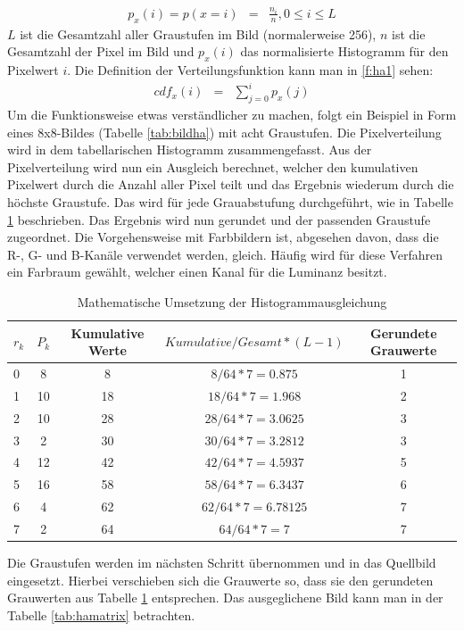 \begin{eqnarray} \label{f:ha1} p_{x}(i)=p(x=i)&=&\frac{n_{i}}{n}, 0\leq i \leq L \end{eqnarray}
$L$ ist die Gesamtzahl aller Graustufen im Bild (normalerweise 256), $n$ ist die Gesamtzahl der Pixel im Bild und $p_{x}(i)$ das normalisierte Histogramm für den Pixelwert $i$. Die Definition der Verteilungsfunktion kann man in \ref{f:ha1} sehen:
\begin{eqnarray} cdf_{x}(i) &=& \sum_{j=0}^i p_{x}(j)\end{eqnarray}
Um die Funktionsweise etwas verständlicher zu machen, folgt ein Beispiel in Form eines 8x8-Bildes (Tabelle \ref{tab:bildha}) mit acht Graustufen. Die Pixelverteilung wird in dem tabellarischen Histogramm zusammengefasst.  
Aus der Pixelverteilung wird nun ein Ausgleich berechnet, welcher den kumulativen Pixelwert durch die Anzahl aller Pixel teilt und das Ergebnis wiederum durch die höchste Graustufe. Das wird für jede Grauabstufung durchgeführt, wie in Tabelle \ref{tab:haberechnung} beschrieben.
 Das Ergebnis wird nun gerundet und der passenden Graustufe zugeordnet. Die Vorgehensweise mit Farbbildern ist, abgesehen davon, dass die R-, G- und B-Kanäle verwendet werden, gleich. Häufig wird für diese Verfahren ein Farbraum gewählt, welcher einen Kanal für die Luminanz besitzt.
  \begin{table}
  [h]
  \caption{Mathematische Umsetzung der Histogrammausgleichung}
  \label{tab:haberechnung}
  \centering
  \begin{tabular}{|l|c|c|c|c|}
  \hline
  $r_{k}$&$P_{k}$&Kumulative Werte&$Kumulative/Gesamt*(L-1)$&Gerundete Grauwerte\\
  \hline
  0 & 8 & 8 & $8/64*7=0.875$ & 1\\
  \hline
  1 & 10 & 18 & $18/64*7=1.968$ & 2\\
  \hline
  2 & 10 & 28 & $28/64*7=3.0625$ & 3\\
  \hline
  3 & 2 & 30 & $30/64*7=3.2812$ & 3\\
  \hline
  4 & 12 & 42 & $42/64*7=4.5937$ & 5\\
  \hline
  5 & 16 & 58 & $58/64*7=6.3437$ & 6\\
  \hline
  6 & 4 & 62 & $62/64*7=6.78125$ & 7\\
  \hline
  7 & 2 & 64 & $64/64*7=7$ & 7\\
  \hline
  \end{tabular}
  \end{table}
Die Graustufen werden im nächsten Schritt übernommen und in das Quellbild eingesetzt. Hierbei verschieben sich die Grauwerte so, dass sie den gerundeten Grauwerten aus Tabelle \ref{tab:haberechnung} entsprechen. Das ausgeglichene Bild kann man in der Tabelle \ref{tab:hamatrix} betrachten. 
